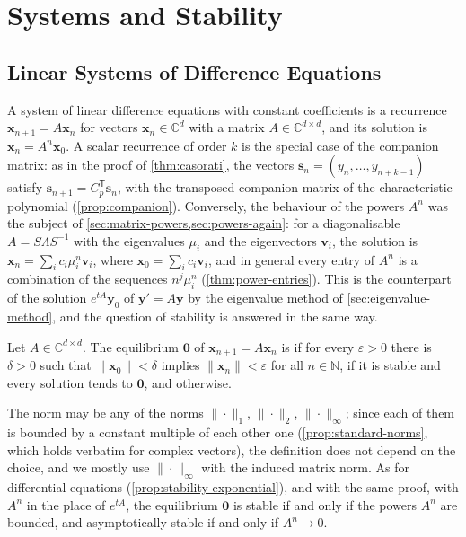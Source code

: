 \section{Systems and Stability}
\label{sec:difference-systems}

\subsection{Linear Systems of Difference Equations}

A system of linear difference equations with constant coefficients is a recurrence $\mathbf x_{n+1}=A\mathbf x_n$ for vectors $\mathbf x_n\in\mathbb C^d$ with a matrix $A\in\mathbb C^{d\times d}$, and its solution is $\mathbf x_n=A^n\mathbf x_0$. A scalar recurrence of order $k$ is the special case of the companion matrix: as in the proof of \cref{thm:casorati}, the vectors $\mathbf s_n=(y_n,\ldots,y_{n+k-1})$ satisfy $\mathbf s_{n+1}=C_p^{\mathsf T}\mathbf s_n$, with the transposed companion matrix of the characteristic polynomial (\cref{prop:companion}). Conversely, the behaviour of the powers $A^n$ was the subject of \cref{sec:matrix-powers,sec:powers-again}: for a diagonalisable $A=S\Lambda S^{-1}$ with the eigenvalues $\mu_i$ and the eigenvectors $\mathbf v_i$, the solution is $\mathbf x_n=\sum_ic_i\mu_i^n\mathbf v_i$, where $\mathbf x_0=\sum_ic_i\mathbf v_i$, and in general every entry of $A^n$ is a combination of the sequences $n^j\mu_i^n$ (\cref{thm:power-entries}). This is the counterpart of the solution $e^{tA}\mathbf y_0$ of $\mathbf y'=A\mathbf y$ by the eigenvalue method of \cref{sec:eigenvalue-method}, and the question of stability is answered in the same way.

\begin{definition}
\label{def:difference-stability}
Let $A\in\mathbb C^{d\times d}$. The equilibrium $\mathbf 0$ of $\mathbf x_{n+1}=A\mathbf x_n$ is  if for every $\varepsilon>0$ there is $\delta>0$ such that $\|\mathbf x_0\|<\delta$ implies $\|\mathbf x_n\|<\varepsilon$ for all $n\in\mathbb N$,  if it is stable and every solution tends to $\mathbf 0$, and  otherwise.
\end{definition}

The norm may be any of the norms $\|\cdot\|_1$, $\|\cdot\|_2$, $\|\cdot\|_\infty$; since each of them is bounded by a constant multiple of each other one (\cref{prop:standard-norms}, which holds verbatim for complex vectors), the definition does not depend on the choice, and we mostly use $\|\cdot\|_\infty$ with the induced matrix norm. As for differential equations (\cref{prop:stability-exponential}), and with the same proof, with $A^n$ in the place of $e^{tA}$, the equilibrium $\mathbf 0$ is stable if and only if the powers $A^n$ are bounded, and asymptotically stable if and only if $A^n\to0$.

